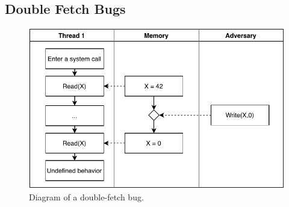\documentclass[conference]{IEEEtran}
\begin{document}
\subsection{Double Fetch Bugs}
\label{subsec:doublefetch}

\begin{figure}[]
  \centering
  \includegraphics[width=.85\linewidth]{img/doublefetch.pdf}
  \caption{Diagram of a double-fetch bug.}
  \label{fig:doublefetch}
\end{figure}
\end{document}
